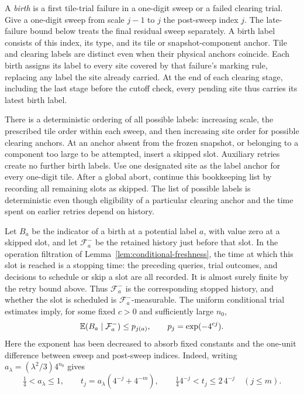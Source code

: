 A \emph{birth} is a first tile-trial failure in a one-digit sweep or a
failed clearing trial. Give a one-digit sweep from scale $j-1$ to $j$ the
post-sweep index $j$. The late-failure bound below treats the final residual
sweep separately. A birth
label consists of this index, its type, and its tile or snapshot-component
anchor.  Tile and clearing labels are distinct even when their physical
anchors coincide. Each birth assigns its label to every site covered by
that failure's marking rule, replacing any label the site already carried.
At the end of each clearing stage, including the last stage before the
cutoff check, every pending site thus carries its latest birth label.

There is a deterministic ordering of all possible labels: increasing scale,
the prescribed tile order within each sweep, and then increasing site
order for possible clearing anchors.  At an anchor absent from the frozen
snapshot, or belonging to a component too large to be attempted, insert a
skipped slot.  Auxiliary retries create no further birth labels.
Use one designated site as the label anchor for every one-digit tile.
After a global abort, continue this bookkeeping list by recording all
remaining slots as skipped. The list of
possible labels is deterministic even though eligibility of a particular
clearing anchor and the time spent on earlier retries depend on history.

Let $B_a$ be the indicator of a birth at a potential label $a$, with value
zero at a skipped slot, and let $\mathcal F_a^-$ be the retained history
just before that slot. In the operation filtration of
Lemma~\ref{lem:conditional-freshness}, the time at which this slot is
reached is a stopping time: the preceding queries, trial outcomes, and
decisions to schedule or skip a slot are all recorded. It is almost surely
finite by the retry bound above. Thus $\mathcal F_a^-$ is the corresponding
stopped history, and whether the slot is scheduled is
$\mathcal F_a^-$-measurable. The uniform conditional trial estimates imply,
for some fixed $c>0$ and sufficiently large $n_0$,
\begin{equation}
 \mathbb E(B_a\mid\mathcal F_a^-)
 \le p_{j(a)},\qquad p_j=\exp(-4^{cj}).
 \label{eq:history-birth}
\end{equation}
Here the exponent has been decreased to absorb fixed constants and the
one-unit difference between sweep and post-sweep indices.  Indeed,
writing $a_\lambda=(\lambda^2/3)4^{n_0}$ gives
\begin{equation}
 \tfrac14<a_\lambda\le1,\qquad
 t_j=a_\lambda(4^{-j}+4^{-m}),\qquad
 \tfrac14 4^{-j}<t_j\le2\,4^{-j}\quad(j\le m).
 \label{eq:history-scale-comparison}
\end{equation}


